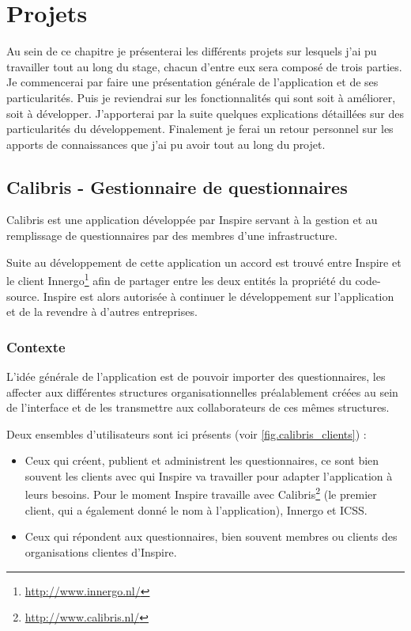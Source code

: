 \documentclass[12pt,a4paper]{book}
\begin{document}
\chapter{Projets}

Au sein de ce chapitre je présenterai les différents projets sur lesquels j'ai pu travailler tout au long du stage, chacun d'entre eux sera composé de trois parties. Je commencerai par faire une présentation générale de l'application et de ses particularités. Puis je reviendrai sur les fonctionnalités qui sont soit à améliorer, soit à développer. J'apporterai par la suite quelques explications détaillées sur des particularités du développement. Finalement je ferai un retour personnel sur les apports de connaissances que j'ai pu avoir tout au long du projet.

\section{Calibris - Gestionnaire de questionnaires}

\label{section.gestionnaire_questionnaire_dev}

\label{sec:calibris}
Calibris est une application développée par Inspire servant à la gestion et au remplissage de questionnaires par des membres d'une infrastructure.

Suite au développement de cette application un accord est trouvé entre Inspire et le client Innergo\footnote{\url{http://www.innergo.nl/}} afin de partager entre les deux entités la propriété du code-source. Inspire est alors autorisée à continuer le développement sur l'application et de la revendre à d'autres entreprises.

\subsection{Contexte}

L'idée générale de l'application est de pouvoir importer des questionnaires, les affecter aux différentes structures organisationnelles préalablement créées au sein de l'interface et de les transmettre aux collaborateurs de ces mêmes structures. 

Deux ensembles d'utilisateurs sont ici présents (voir \cref{fig.calibris_clients}) :
\begin{itemize}
  \item Ceux qui créent, publient et administrent les questionnaires, ce sont bien souvent les clients avec qui Inspire va travailler pour adapter l'application à leurs besoins. Pour le moment Inspire travaille avec Calibris\footnote{\url{http://www.calibris.nl/}} (le premier client, qui a également donné le nom à l'application), Innergo et ICSS.
  \item Ceux qui répondent aux questionnaires, bien souvent membres ou clients des organisations clientes d'Inspire. 
\end{itemize}
\end{document}
